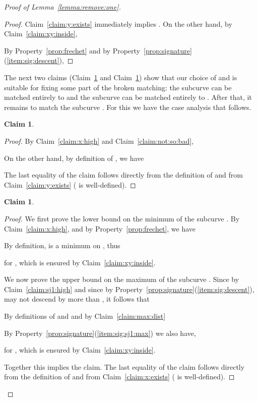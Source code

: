 \documentclass[11pt, letter]{article}
\newtheorem{claim}[theorem]{Claim}
\newcommand{\lemref}[1]{Lemma~\ref{lemma:#1}}
\newcommand{\claimlab}[1]{\label{claim:#1}}
\newcommand{\claimref}[1]{Claim~\ref{claim:#1}}
\newcommand{\propref}[1]{Property~\ref{prop:#1}}
\begin{document}
\begin{proof}[Proof of \lemref{remove:one}]
\begin{proof}
\claimref{y:exists} immediately implies .
On the other hand, by \claimref{xy:inside}, 

By \propref{frechet} and by \propref{signature}(\ref{item:sig:descent}),

\end{proof}




The next two claims (\claimref{frechet:y} and
\claimref{frechet:x}) show that our choice of  and  is suitable for fixing some part
of the broken matching: the subcurve  can be matched
entirely to  and the subcurve  can be matched entirely to
. After that, it remains to match the subcurve . For
this we have the case analysis that follows.


\begin{claim}

\claimlab{frechet:y}
\claimlab{frechet:ya}
\end{claim}
\begin{proof}
By \claimref{x:high} and \claimref{not:so:bad},

On the other hand, by definition of , we have

The last equality of the claim follows directly from the definition of  and from \claimref{y:exists} ( is well-defined).
\end{proof}

\begin{claim}

\claimlab{frechet:x}
\end{claim}
\begin{proof}
We first prove the lower bound on the minimum of the subcurve .
By \claimref{x:high}, and by \propref{frechet}, we have
 
By definition,  is a minimum on , thus

for , which is ensured by \claimref{xy:inside}. 

We now prove the upper bound on the maximum of the subcurve .
Since by \claimref{sj1:high}  and since by 
\propref{signature}(\ref{item:sig:descent}),  may
not descend by more than , it follows that 

By definitions of  and  and by \claimref{max:dist}

By \propref{signature}(\ref{item:sig:sj1:max}) we also have, 

for , which is ensured by \claimref{xy:inside}. 

Together this implies the claim. The last equality of the claim follows directly from the
definition of  and from \claimref{x:exists} ( is well-defined).
\end{proof}


\end{proof}
\end{document}
